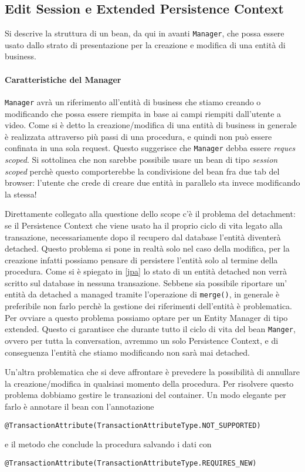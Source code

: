 \subsection{Edit Session e Extended Persistence Context}
Si descrive la struttura di un bean, da qui in avanti \texttt{Manager}, che possa essere usato dallo strato di presentazione per la creazione e modifica di una entità di business.

\paragraph{Caratteristiche del Manager}
\texttt{Manager} avrà un riferimento all'entità di business che stiamo creando o modificando che possa essere riempita in base ai campi riempiti dall'utente a video.
Come si è detto la creazione/modifica di una entità di business in generale è realizzata attraverso più passi di una procedura, e quindi non può essere confinata in una sola request. Questo suggerisce che \texttt{Manager} debba essere 
\textsl{reques scoped}. Si sottolinea che non sarebbe possibile usare un bean di tipo \textsl{session scoped} perchè questo comporterebbe la condivisione del bean fra due tab del browser: l'utente che crede di creare due entità in parallelo
sta invece modificando la stessa!

Direttamente collegato alla questione dello scope c'è il problema del detachment: se il Persistence Context che viene usato ha il proprio ciclo di vita legato alla transazione, necessariamente dopo il recupero dal database l'entità diventerà
detached. Questo problema si pone in realtà solo nel caso della modifica, per la creazione infatti possiamo pensare di persistere l'entità solo al termine della procedura. Come si è spiegato in \ref{jpa} lo stato di un entità detached non verrà scritto sul database in nessuna transazione. Sebbene sia possibile riportare un' entità da detached a managed tramite
l'operazione di \texttt{merge()}, in generale è preferibile non farlo perchè la gestione dei riferimenti dell'entità è problematica. Per ovviare a questo problema possiamo optare per un Entity Manager di tipo extended. Questo ci garantisce
che durante tutto il ciclo di vita del bean \texttt{Manger}, ovvero per tutta la conversation, avremmo un solo Persistence Context, e di conseguenza l'entità che stiamo modificando non sarà mai detached.

Un'altra problematica che si deve affrontare è prevedere la possibilità di annullare la creazione/modifica in qualsiasi momento della procedura. Per risolvere questo problema dobbiamo gestire le transazioni del container.
Un modo elegante per farlo è annotare il bean con l'annotazione 
\begin{lstlisting} 
@TransactionAttribute(TransactionAttributeType.NOT_SUPPORTED)
\end{lstlisting}
e il metodo che conclude la procedura salvando i dati con 
\begin{lstlisting}
@TransactionAttribute(TransactionAttributeType.REQUIRES_NEW)
\end{lstlisting}



